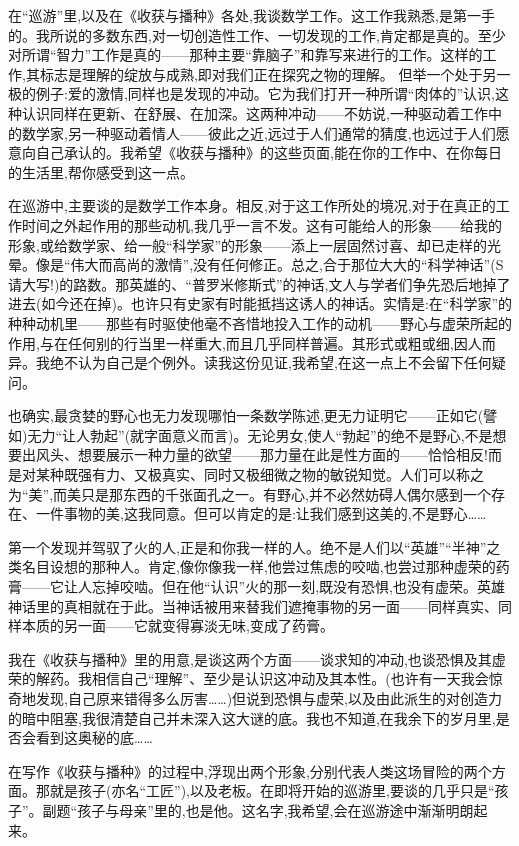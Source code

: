  在“巡游”里,以及在《收获与播种》各处,我谈数学工作。这工作我熟悉,是第一手的。我所说的多数东西,对一切创造性工作、一切发现的工作,肯定都是真的。至少对所谓“智力”工作是真的——那种主要“靠脑子”和靠写来进行的工作。这样的工作,其标志是理解的绽放与成熟,即对我们正在探究之物的理解。%
但举一个处于另一极的例子:爱的激情,同样也是发现的冲动。它为我们打开一种所谓“肉体的”认识,这种认识同样在更新、在舒展、在加深。这两种冲动——不妨说,一种驱动着工作中的数学家,另一种驱动着情人——彼此之近,远过于人们通常的猜度,也远过于人们愿意向自己承认的。我希望《收获与播种》的这些页面,能在你的工作中、在你每日的生活里,帮你感受到这一点。

在巡游中,主要谈的是数学工作本身。相反,对于这工作所处的境况,对于在真正的工作时间之外起作用的那些动机,我几乎一言不发。这有可能给人的形象——给我的形象,或给数学家、给一般“科学家”的形象——添上一层固然讨喜、却已走样的光晕。像是“伟大而高尚的激情”,没有任何修正。总之,合于那位大大的“科学神话”(S 请大写!)的路数。那英雄的、“普罗米修斯式”的神话,文人与学者们争先恐后地掉了进去(如今还在掉)。也许只有史家有时能抵挡这诱人的神话。实情是:在“科学家”的种种动机里——那些有时驱使他毫不吝惜地投入工作的动机——野心与虚荣所起的作用,与在任何别的行当里一样重大,而且几乎同样普遍。其形式或粗或细,因人而异。我绝不认为自己是个例外。读我这份见证,我希望,在这一点上不会留下任何疑问。

 也确实,最贪婪的野心也无力发现哪怕一条数学陈述,更无力证明它——正如它(譬如)无力“让人勃起”(就字面意义而言)。无论男女,使人“勃起”的绝不是野心,不是想要出风头、想要展示一种力量的欲望——那力量在此是性方面的——恰恰相反!而是对某种既强有力、又极真实、同时又极细微之物的敏锐知觉。人们可以称之为“美”,而美只是那东西的千张面孔之一。有野心,并不必然妨碍人偶尔感到一个存在、一件事物的美,这我同意。但可以肯定的是:让我们感到这美的,不是野心……

第一个发现并驾驭了火的人,正是和你我一样的人。绝不是人们以“英雄”“半神”之类名目设想的那种人。肯定,像你像我一样,他尝过焦虑的咬啮,也尝过那种虚荣的药膏——它让人忘掉咬啮。但在他“认识”火的那一刻,既没有恐惧,也没有虚荣。英雄神话里的真相就在于此。当神话被用来替我们遮掩事物的另一面——同样真实、同样本质的另一面——它就变得寡淡无味,变成了药膏。

我在《收获与播种》里的用意,是谈这两个方面——谈求知的冲动,也谈恐惧及其虚荣的解药。我相信自己“理解”、至少是认识这冲动及其本性。(也许有一天我会惊奇地发现,自己原来错得多么厉害……)但说到恐惧与虚荣,以及由此派生的对创造力的暗中阻塞,我很清楚自己并未深入这大谜的底。我也不知道,在我余下的岁月里,是否会看到这奥秘的底……

在写作《收获与播种》的过程中,浮现出两个形象,分别代表人类这场冒险的两个方面。那就是孩子(亦名“工匠”),以及老板。在即将开始的巡游里,要谈的几乎只是“孩子”。副题“孩子与母亲”里的,也是他。这名字,我希望,会在巡游途中渐渐明朗起来。

